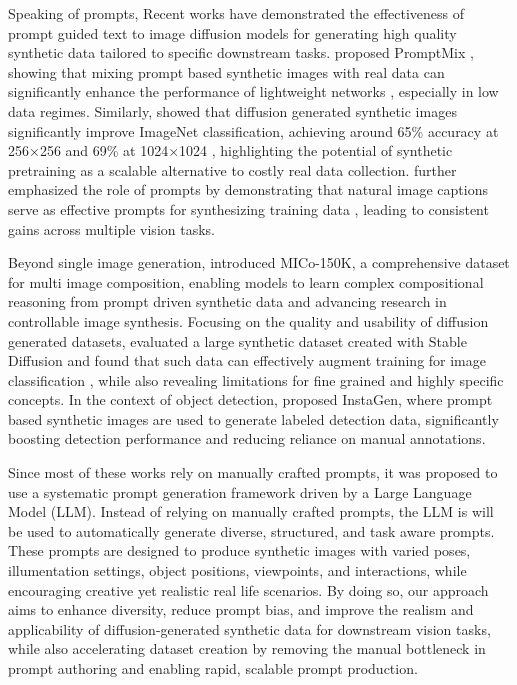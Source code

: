 \documentclass[conference]{IEEEtran}
\begin{document}
Speaking of prompts, Recent works have demonstrated the effectiveness of prompt guided text to image diffusion models for generating high quality synthetic data tailored to specific downstream tasks. \citet{bakhtiarnia2023promptmixtexttoimagediffusionmodels} proposed PromptMix , showing that mixing prompt based synthetic images with real data can significantly enhance the performance of lightweight networks , especially in low data regimes. Similarly, \citet{azizi2023syntheticdatadiffusionmodels} showed that diffusion generated synthetic images significantly improve ImageNet classification, achieving around 65\% accuracy at 256×256 and 69\% at 1024×1024 , highlighting the potential of synthetic pretraining as a scalable alternative to costly real data collection. \citet{Lei_2025} further emphasized the role of prompts by demonstrating that natural image captions serve as effective prompts for synthesizing training data , leading to consistent gains across multiple vision tasks.

Beyond single image generation, \citet{wei2025mico150kcomprehensivedatasetadvancing} introduced MICo-150K, a comprehensive dataset for multi image composition, enabling models to learn complex compositional reasoning from prompt driven synthetic data and advancing research in controllable image synthesis. Focusing on the quality and usability of diffusion generated datasets, \citet{10.1007/978-981-99-3243-6_64} evaluated a large synthetic dataset created with Stable Diffusion and found that such data can effectively augment training for image classification , while also revealing limitations for fine grained and highly specific concepts. In the context of object detection, \citet{Feng_2024_CVPR} proposed InstaGen, where prompt based synthetic images are used to generate labeled detection data, significantly boosting detection performance and reducing reliance on manual annotations.

Since most of these works rely on manually crafted prompts, it was proposed to use a systematic prompt generation framework driven by a Large Language Model (LLM). Instead of relying on manually crafted prompts, the LLM is will be used to automatically generate diverse, structured, and task aware prompts. These prompts are designed to produce synthetic images with varied poses, illumentation settings, object positions, viewpoints, and interactions, while encouraging creative yet realistic real life scenarios. By doing so, our approach aims to enhance diversity, reduce prompt bias, and improve the realism and applicability of diffusion-generated synthetic data for downstream vision tasks, while also accelerating dataset creation by removing the manual bottleneck in prompt authoring and enabling rapid, scalable prompt production.
\\
\end{document}
